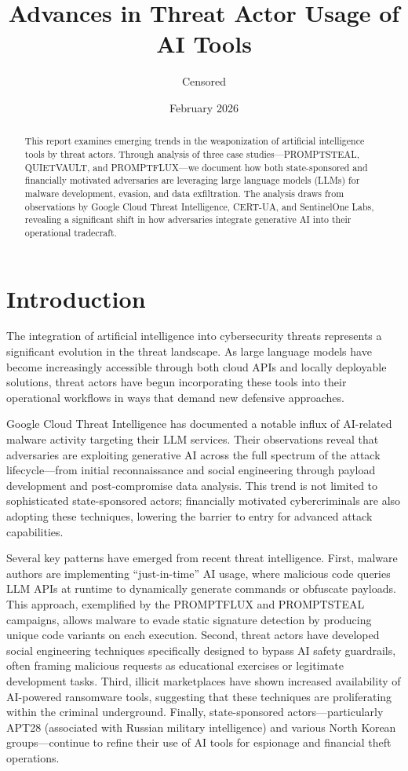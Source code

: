 \documentclass[12pt,a4paper]{article}
\title{Advances in Threat Actor Usage of AI Tools}
\author{Censored}
\date{February 2026}
\begin{document}
\maketitle

\begin{abstract}
This report examines emerging trends in the weaponization of artificial intelligence tools by threat actors. Through analysis of three case studies—PROMPTSTEAL, QUIETVAULT, and PROMPTFLUX—we document how both state-sponsored and financially motivated adversaries are leveraging large language models (LLMs) for malware development, evasion, and data exfiltration. The analysis draws from observations by Google Cloud Threat Intelligence, CERT-UA, and SentinelOne Labs, revealing a significant shift in how adversaries integrate generative AI into their operational tradecraft.
\end{abstract}

\tableofcontents
\newpage

\section{Introduction}

The integration of artificial intelligence into cybersecurity threats represents a significant evolution in the threat landscape. As large language models have become increasingly accessible through both cloud APIs and locally deployable solutions, threat actors have begun incorporating these tools into their operational workflows in ways that demand new defensive approaches.

Google Cloud Threat Intelligence has documented a notable influx of AI-related malware activity targeting their LLM services. Their observations reveal that adversaries are exploiting generative AI across the full spectrum of the attack lifecycle—from initial reconnaissance and social engineering through payload development and post-compromise data analysis. This trend is not limited to sophisticated state-sponsored actors; financially motivated cybercriminals are also adopting these techniques, lowering the barrier to entry for advanced attack capabilities.

Several key patterns have emerged from recent threat intelligence. First, malware authors are implementing ``just-in-time'' AI usage, where malicious code queries LLM APIs at runtime to dynamically generate commands or obfuscate payloads. This approach, exemplified by the PROMPTFLUX and PROMPTSTEAL campaigns, allows malware to evade static signature detection by producing unique code variants on each execution. Second, threat actors have developed social engineering techniques specifically designed to bypass AI safety guardrails, often framing malicious requests as educational exercises or legitimate development tasks. Third, illicit marketplaces have shown increased availability of AI-powered ransomware tools, suggesting that these techniques are proliferating within the criminal underground. Finally, state-sponsored actors—particularly APT28 (associated with Russian military intelligence) and various North Korean groups—continue to refine their use of AI tools for espionage and financial theft operations.
\end{document}
